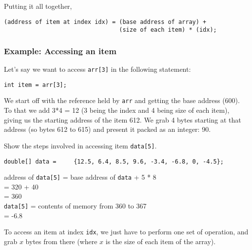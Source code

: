 Putting it all together,

\begin{verbatim}
(address of item at index idx) = (base address of array) + 
                                 (size of each item) * (idx);
\end{verbatim}

\subsubsection{Example: Accessing an item}

Let's say we want to access \texttt{arr[3]} in the following statement:

\begin{lstlisting}
int item = arr[3];
\end{lstlisting}

We start off with the reference held by \texttt{arr} and getting the base address (600). To that we add 3*4 = 12 (3 being the index and 4 being size of each item), giving us the starting address of the item 612. We grab 4 bytes starting at that address (so bytes 612 to 615) and present it packed as an integer: 90.

\begin{exercise}
Show the steps involved in accessing item \texttt{data[5]}.

\vskip 0.5cm
\begin{lstlisting}
double[] data = 	{12.5, 6.4, 8.5, 9.6, -3.4, -6.8, 0, -4.5};
\end{lstlisting}

\bgroup \tikzset{png export}  \egroup
\newline
\end{exercise}
\begin{answer}
address of \texttt{data[5]} = base address of \texttt{data} + 5 * 8\\
= 320 + 40 \\
= 360\\

\texttt{data[5]} = contents of memory from 360 to 367 \\
= -6.8	
\end{answer}

To access an item at index \texttt{idx}, we just have to perform one set of operation, and grab $x$ bytes from there (where $x$ is the size of each item of the array). 

